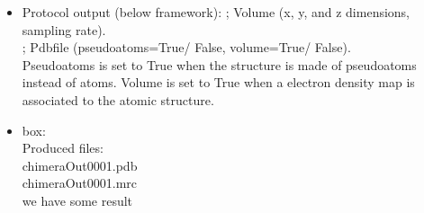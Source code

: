 \begin{itemize}
\begin{itemize}
    \begin{itemize}
     \item Protocol output (below \scipion framework):
      ; Volume (x, y, and z dimensions, sampling rate).\\
      ; Pdbfile (pseudoatoms=True/ False, volume=True/ False).\\Pseudoatoms is set to True when the structure is made of pseudoatoms instead of atoms. Volume is set to True when a electron density map is associated to the atomic structure.\\
     \item {} box:\\Produced files:\\chimeraOut0001.pdb\\chimeraOut0001.mrc\\we have some result\\
    \end{itemize}
    
   \end{itemize}
  
 \end{itemize}
